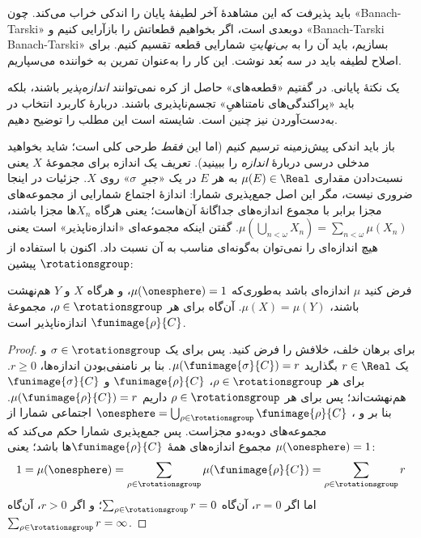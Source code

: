\documentclass[../../../include/open-logic-section]{subfiles}
\begin{document}
باید پذیرفت که این مشاهدهٔ آخر لطیفهٔ پایان
 را اندکی خراب می‌کند. چون
«Banach-Tarski» دوبعدی است، اگر بخواهیم قطعاتش را بازآرایی کنیم و
«Banach-Tarski Banach-Tarski» بسازیم، باید آن را به
\emph{بی‌نهایتِ} شمارایی قطعه تقسیم کنیم. برای اصلاح لطیفه باید در
سه بُعد نوشت. این کار را به‌عنوان تمرین به خواننده می‌سپاریم.

یک نکتهٔ پایانی. در  گفتیم «قطعه‌های» حاصل از
کره نمی‌توانند \emph{اندازه‌پذیر} باشند، بلکه باید
«پراکندگی‌های نامتناهیِ» تجسم‌ناپذیری باشند. دربارهٔ کاربرد انتخاب
در به‌دست‌آوردن  نیز چنین است. شایسته است
این مطلب را توضیح دهیم.

باز باید اندکی پیش‌زمینه ترسیم کنیم (اما این \emph{فقط} طرحی کلی
است؛ شاید بخواهید مدخلی درسی دربارهٔ \emph{اندازه} را ببینید).
تعریف یک اندازه برای مجموعهٔ $X$ یعنی نسبت‌دادن مقداری
$\mu(E) \in \Real$ به هر $E$ در یک «جبرِ~$\sigma$» روی $X$.
جزئیات در اینجا ضروری نیست، مگر این اصل جمع‌پذیری شمارا: اندازهٔ
اجتماع شمارایی از مجموعه‌های مجزا برابر با مجموع اندازه‌های جداگانهٔ
آن‌هاست؛ یعنی هرگاه $X_n$ها مجزا باشند،
$\mu(\bigcup_{n < \omega} X_n) =
\sum_{n < \omega}\mu(X_n)$. گفتن اینکه مجموعه‌ای «اندازه‌ناپذیر»
است یعنی هیچ اندازه‌ای را نمی‌توان به‌گونه‌ای مناسب به آن نسبت داد.
اکنون با استفاده از $\rotationsgroup$ پیشین:

\begin{cor}[ویتالی]
فرض کنید $\mu$ اندازه‌ای باشد به‌طوری‌که
$\mu(\onesphere) = 1$، و هرگاه $X$ و $Y$ هم‌نهشت باشند،
$\mu(X) = \mu(Y)$. آن‌گاه برای هر
$\rho \in \rotationsgroup$، مجموعهٔ $\funimage{\rho}{C}$
اندازه‌ناپذیر است.
\end{cor}

\begin{proof}
برای برهان خلف، خلافش را فرض کنید. پس برای یک
$\sigma \in \rotationsgroup$ و یک $r \in \Real$ بگذارید
$\mu(\funimage{\sigma}{C}) = r$. بنا بر نامنفی‌بودن اندازه‌ها،
$r \geq 0$. برای هر $\rho \in \rotationsgroup$،
$\funimage{\rho}{C}$ و $\funimage{\sigma}{C}$ هم‌نهشت‌اند؛ پس برای
هر $\rho \in \rotationsgroup$ داریم
$\mu(\funimage{\rho}{C}) = r$. بنا بر  و
،
$\onesphere =
\bigcup_{\rho \in \rotationsgroup}\funimage{\rho}{C}$ اجتماعی
شمارا از مجموعه‌های دوبه‌دو مجزاست. پس جمع‌پذیری شمارا حکم می‌کند
که $\mu(\onesphere) = 1$ مجموع اندازه‌های همهٔ
$\funimage{\rho}{C}$ها باشد؛ یعنی:
\[
	1 = \mu(\onesphere) = \sum_{\rho \in \rotationsgroup}\mu(\funimage{\rho}{C}) = \sum_{\rho \in \rotationsgroup}r
\]
اما اگر $r = 0$، آن‌گاه
$\sum_{\rho \in \rotationsgroup}r = 0$؛ و اگر $r > 0$، آن‌گاه
$\sum_{\rho \in \rotationsgroup}r = \infty$.
\end{proof}
\end{document}
